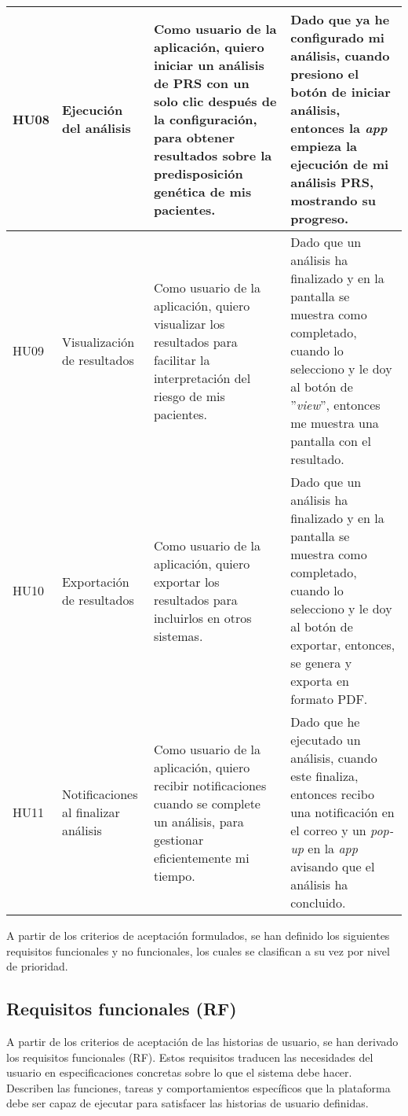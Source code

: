 \begin{longtable}{ p{1cm}  p{2.3cm}  p{5cm}  p{5cm} }
\midrule
HU08 & Ejecución del análisis & Como usuario de la aplicación, quiero iniciar un análisis de PRS con un solo clic después de la configuración, para obtener resultados sobre la predisposición genética de mis pacientes. & Dado que ya he configurado mi análisis, cuando presiono el botón de iniciar análisis, entonces la \textit{app} empieza la ejecución de mi análisis PRS, mostrando su progreso. \\
\midrule
HU09 & Visualización de resultados & Como usuario de la aplicación, quiero visualizar los resultados para facilitar la interpretación del riesgo de mis pacientes. & Dado que un análisis ha finalizado y en la pantalla se muestra como completado, cuando lo selecciono y le doy al botón de ''\textit{view}'', entonces me muestra una pantalla con el resultado. \\
\midrule
HU10 & Exportación de resultados & Como usuario de la aplicación, quiero exportar los resultados para incluirlos en otros sistemas. & Dado que un análisis ha finalizado y en la pantalla se muestra como completado, cuando lo selecciono y le doy al botón de exportar, entonces, se genera y exporta en formato PDF. \\
\midrule
HU11 & Notificaciones al finalizar análisis & Como usuario de la aplicación, quiero recibir notificaciones cuando se complete un análisis, para gestionar eficientemente mi tiempo. & Dado que he ejecutado un análisis, cuando este finaliza, entonces recibo una notificación en el correo y un \textit{pop-up} en la \textit{app} avisando que el análisis ha concluido. \\

\end{longtable}

A partir de los criterios de aceptación formulados, se han definido los siguientes requisitos funcionales y no funcionales, los cuales se clasifican a su vez por nivel de prioridad.

\subsection{Requisitos funcionales (RF)}

 A partir de los criterios de aceptación de las historias de usuario, se han derivado los requisitos funcionales (RF). Estos requisitos traducen las necesidades del usuario en especificaciones concretas sobre lo que el sistema debe hacer. Describen las funciones, tareas y comportamientos específicos que la plataforma debe ser capaz de ejecutar para satisfacer las historias de usuario definidas.

